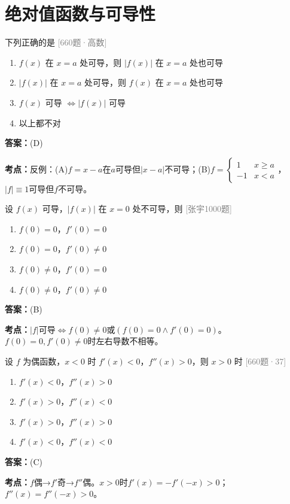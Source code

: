 \documentclass[12pt,a4paper]{ctexbook}
\newcommand{\src}[1]{\hfill\textcolor{gray}{\small\textsf{[#1]}}}
\newcommand{\ans}[1]{\begin{answerbox}\textbf{答案：}#1\end{answerbox}}
\newcommand{\kpt}[1]{\textbf{考点：}#1}
\begin{document}
\section{绝对值函数与可导性}

\begin{exercise}[660题·$|f|$ 与 $f$ 的可导性]
下列正确的是 \hfill\src{660题·高数}
\begin{enumerate}[label=(\Alph*),nosep]
  \item $f(x)$ 在 $x=a$ 处可导，则 $|f(x)|$ 在 $x=a$ 处也可导
  \item $|f(x)|$ 在 $x=a$ 处可导，则 $f(x)$ 在 $x=a$ 处也可导
  \item $f(x)$ 可导 $\iff |f(x)|$ 可导
  \item 以上都不对
\end{enumerate}
\end{exercise}
\ans{(D)}
\kpt{反例：(A)$f=x-a$在$a$可导但$|x-a|$不可导；(B)$f=\begin{cases}1&x\geqslant a\\-1&x<a\end{cases}$，$|f|\equiv 1$可导但$f$不可导。}

\bigskip

\begin{exercise}[张宇1000题·$|f|$ 不可导条件]
设 $f(x)$ 可导，$|f(x)|$ 在 $x=0$ 处不可导，则 \hfill\src{张宇1000题}
\begin{enumerate}[label=(\Alph*),nosep]
  \item $f(0)=0$，$f'(0)=0$
  \item $f(0)=0$，$f'(0)\neq 0$
  \item $f(0)\neq 0$，$f'(0)=0$
  \item $f(0)\neq 0$，$f'(0)\neq 0$
\end{enumerate}
\end{exercise}
\ans{(B)}
\kpt{$|f|$可导$\iff f(0)\neq 0$或$(f(0)=0\land f'(0)=0)$。$f(0)=0,f'(0)\neq 0$时左右导数不相等。}

\bigskip

\begin{exercise}[660题·偶函数导数符号·37题]
设 $f$ 为偶函数，$x<0$ 时 $f'(x)<0$，$f''(x)>0$，则 $x>0$ 时 \hfill\src{660题·37}
\begin{enumerate}[label=(\Alph*),nosep]
  \item $f'(x)<0$，$f''(x)>0$
  \item $f'(x)>0$，$f''(x)<0$
  \item $f'(x)>0$，$f''(x)>0$
  \item $f'(x)<0$，$f''(x)<0$
\end{enumerate}
\end{exercise}
\ans{(C)}
\kpt{$f$偶→$f'$奇→$f''$偶。$x>0$时$f'(x)=-f'(-x)>0$；$f''(x)=f''(-x)>0$。}
\end{document}
